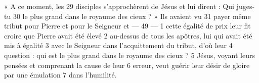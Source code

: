« A ce moment, les	 
29	 	disciples s'approchèrent de Jésus et lui dirent : Qui juges-tu	 
30	 	le plus grand dans le royaume des cieux ? » Ils avaient vu	 
31	 	payer même tribut pour Pierre et pour le Seigneur et	 
 	--- 49 ---	 
1	 	cette égalité de prix leur fit croire que Pierre avait été élevé	 
2	 	au-dessus de tous les apôtres, lui qui avait été mis à égalité	 
3	 	avec le Seigneur dans l'acquittement du tribut, d'où leur	 
4	 	question : qui est le plus grand dans le royaume des cieux ?	 
5	 	Jésus, voyant leurs pensées et comprenant la cause de leur	 
6	 	erreur, veut guérir leur désir de gloire par une émulation	 
7	 	dans l'humilité.